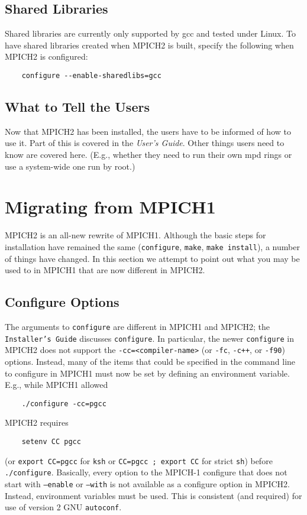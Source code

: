 \documentclass[dvipdfm,11pt]{article}
\begin{document}
\subsection{Shared Libraries}
\label{sec:shared-libraries}

Shared libraries are currently only supported by gcc and tested under
Linux.  To have shared libraries created when MPICH2 is built, specify
the following when MPICH2 is configured:
\begin{verbatim}
    configure --enable-sharedlibs=gcc
\end{verbatim}


\subsection{What to Tell the Users}
\label{sec:telling}

Now that MPICH2 has been installed, the users have to be informed of how
to use it.  Part of this is covered in the \emph{User's Guide}.  Other
things users need to know are covered here.  (E.g., whether they need to
run their own mpd rings or use a system-wide one run by root.)


\section{Migrating from MPICH1}
\label{sec:migrating}

MPICH2 is an all-new rewrite of MPICH1.  Although the basic steps for
installation have remained the same (\texttt{configure}, \texttt{make},
\texttt{make install}), a number of things have changed.  In this
section we attempt to point out what you may be used to in MPICH1 that
are now different in MPICH2.

\subsection{Configure Options}
\label{sec:configure-options}

The arguments to \texttt{configure} are different in MPICH1 and MPICH2;
the \texttt{Installer's Guide} discusses \texttt{configure}.  In
particular, the newer \texttt{configure} in MPICH2 does not support the
\verb+-cc=<compiler-name>+ (or \texttt{-fc}, \texttt{-c++}, or
\texttt{-f90}) options.  Instead, many of the items that could be
specified in the command line to configure in MPICH1 must now be set by
defining an environment variable.  E.g., while MPICH1 allowed
\begin{verbatim}
    ./configure -cc=pgcc
\end{verbatim}
MPICH2 requires
\begin{verbatim}
    setenv CC pgcc
\end{verbatim}
(or \verb+export CC=pgcc+ for \texttt{ksh} or \verb+CC=pgcc ; export CC+
for strict \texttt{sh}) before \texttt{./configure}.  Basically, every
option to the MPICH-1 configure that does not start with
\texttt{--enable} or \texttt{--with} is not available as a configure
option in MPICH2.  Instead, environment variables must be used.  This is
consistent (and required) for use of version 2 GNU \texttt{autoconf}.
\end{document}
